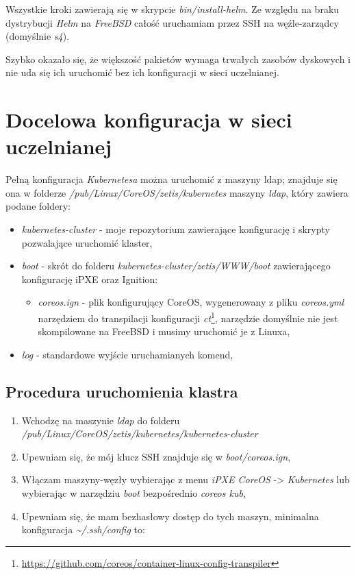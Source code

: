 \documentclass[a4paper,12pt,twoside,openany]{report}
\providecommand{\tightlist}{%
  \setlength{\itemsep}{0pt}\setlength{\parskip}{0pt}}
\DeclareRobustCommand{\href}[2]{#2\footnote{\url{#1}}}
\begin{document}
Wszystkie kroki zawierają się w skrypcie \emph{bin/install-helm}. Ze
względu na braku dystrybucji \emph{Helm} na \emph{FreeBSD} całość
uruchamiam przez SSH na węźle-zarządcy (domyślnie \emph{s4}).

Szybko okazało się, że większość pakietów wymaga trwałych zasobów
dyskowych i nie uda się ich uruchomić bez ich konfiguracji w sieci
uczelnianej.

\hypertarget{docelowa-konfiguracja-w-sieci-uczelnianej}{%
\chapter{Docelowa konfiguracja w sieci
uczelnianej}\label{docelowa-konfiguracja-w-sieci-uczelnianej}}

Pełną konfiguracja \emph{Kubernetesa} można uruchomić z maszyny ldap;
znajduje się ona w folderze \emph{/pub/Linux/CoreOS/zetis/kubernetes}
maszyny \emph{ldap}, który zawiera podane foldery:

\begin{itemize}
\tightlist
\item
  \emph{kubernetes-cluster} - moje repozytorium zawierające konfigurację
  i skrypty pozwalające uruchomić klaster,
\item
  \emph{boot} - skrót do folderu
  \emph{kubernetes-cluster/zetis/WWW/boot} zawierającego konfigurację
  iPXE oraz Ignition:

  \begin{itemize}
  \tightlist
  \item
    \emph{coreos.ign} - plik konfigurujący CoreOS, wygenerowany z pliku
    \emph{coreos.yml} narzędziem do transpilacji konfiguracji
    \href{https://github.com/coreos/container-linux-config-transpiler}{\emph{ct}},
    narzędzie domyślnie nie jest skompilowane na FreeBSD i musimy
    uruchomić je z Linuxa,
  \end{itemize}
\item
  \emph{log} - standardowe wyjście uruchamianych komend,
\end{itemize}

\hypertarget{procedura-uruchomienia-klastra}{%
\section{Procedura uruchomienia
klastra}\label{procedura-uruchomienia-klastra}}

\begin{enumerate}
\def\labelenumi{\arabic{enumi}.}
\tightlist
\item
  Wchodzę na maszynie \emph{ldap} do folderu
  \emph{/pub/Linux/CoreOS/zetis/kubernetes/kubernetes-cluster}
\item
  Upewniam się, że mój klucz SSH znajduje się w \emph{boot/coreos.ign},
\item
  Włączam maszyny-węzły wybierając z menu \emph{iPXE CoreOS}
  -\textgreater{} \emph{Kubernetes} lub wybierając w narzędziu
  \emph{boot} bezpośrednio \emph{coreos kub},
\item
  Upewniam się, że mam bezhasłowy dostęp do tych maszyn, minimalna
  konfiguracja \emph{\textasciitilde{}/.ssh/config} to:
\end{enumerate}
\end{document}

